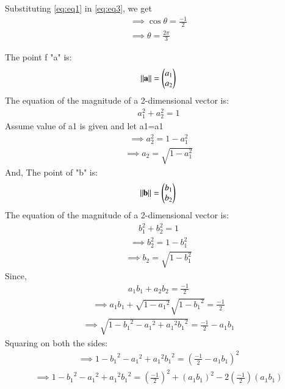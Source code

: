 \documentclass[12pt,-letter paper]{article}
\let\vec\mathbf{}
\let\vec\mathbf{}
\let\vec\mathbf{}
\providecommand{\brak}[1]{\ensuremath{\left(#1\right)}}
\newcommand{\myvec}[1]{\ensuremath{\begin{pmatrix}#1\end{pmatrix}}}
\providecommand{\brak}[1]{\ensuremath{\left(#1\right)}}
\begin{document}
\begin{enumerate}
Substituting \eqref{eq:eq1} in \eqref{eq:eq3}, we get
\begin{align}
	\implies \cos{\theta}=\frac{-1}{2}
	\\
	\implies \theta=\frac{2\pi}{3}
\end{align}

The point f "a" is:
\begin{align}
    \norm{\vec{a}}=\myvec{a_1 \\ a_2} 
    \end{align}
    The equation of the magnitude of a 2-dimensional vector is: 
    \begin{align}
    a_1^2 +a_2^2 =1
    \end{align}
    Assume value of a1 is given and let a1=a1 
  \begin{align}
   \implies   a_2^2 = 1-a_1^2 
    \end{align}
    \begin{align}
 \implies     a_2 = \sqrt{1-a_1^2}
 \label{eq:eq10}
     \end{align}
And, 
The point of "b" is:
\begin{align}
    \norm{\vec{b}}=\myvec{b_1 \\ b_2} 
    \end{align}
    The equation of the magnitude of a 2-dimensional vector is: 
    \begin{align}
    b_1^2 +b_2^2 =1
    \end{align}
  \begin{align}
   \implies   b_2^2 = 1-b_1^2 
    \end{align}
    \begin{align}
 \implies     b_2 = \sqrt{1-b_1^2}
 \label{eq:eq6}
     \end{align}
Since, 
\begin{align}
 {a_1}{b_1} + {a_2}{b_2} = \frac{-1}{2}
\end{align}
\begin{align}
\implies {a_1}{b_1} + \sqrt{1-{a_1}^2} \sqrt{1-{b_1}^2}  = \frac{-1}{2}
\end{align}
\begin{align}
\implies  \sqrt{{1-{b_1}^2-{a_1}^2+{a_1}^2{b_1}^2}} =  \frac{-1}{2}- {a_1}{b_1} 
\end{align}
Squaring on both the sides:
\begin{align}
\implies  {1-{b_1}^2-{a_1}^2+{a_1}^2{b_1}^2} =  \brak{\frac{-1}{2}- {a_1}{b_1}}^2
    \end{align}
    \begin{align}
\implies {1-{b_1}^2-{a_1}^2+{a_1}^2{b_1}^2} = \brak{\frac{-1}{2}}^2 + (a_1b_1)^2 - 2\brak{\frac{-1}{2}}(a_1b_1)

\end{align}
\end{enumerate}
\end{document}
